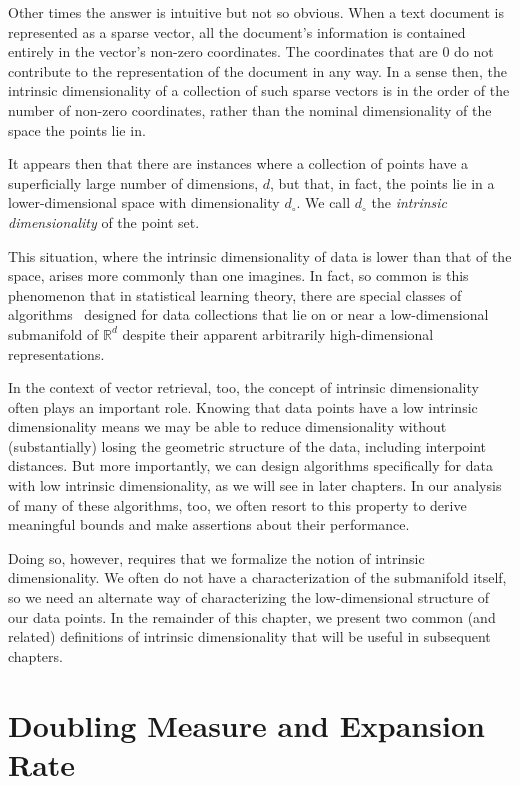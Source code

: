 Other times the answer is intuitive but not so obvious.
When a text document is represented as a sparse vector,
all the document's information is contained entirely in the vector's
non-zero coordinates. The coordinates that are $0$ do not contribute
to the representation of the document in any way.
In a sense then, the intrinsic dimensionality of a collection
of such sparse vectors is in the order of the number of non-zero
coordinates, rather than the nominal dimensionality of the space
the points lie in.

\begin{svgraybox}
It appears then that there are instances where a collection of points
have a superficially large number of dimensions, $d$, but that, in fact,
the points lie in a lower-dimensional space with dimensionality $d_\circ$.
We call $d_\circ$ the \emph{intrinsic dimensionality} of the point set.
\end{svgraybox}

This situation, where the intrinsic dimensionality of data is lower than
that of the space, arises more commonly than one imagines.
In fact, so common is this phenomenon that in statistical learning theory,
there are special classes of algorithms~\citep{ma2012manifold}
designed for data collections that lie on
or near a low-dimensional submanifold of $\mathbb{R}^d$
despite their apparent arbitrarily high-dimensional representations.

In the context of vector retrieval, too, the concept of
intrinsic dimensionality often plays an important role.
Knowing that data points have a low intrinsic dimensionality means
we may be able to reduce dimensionality without (substantially) losing
the geometric structure of the data, including interpoint distances.
But more importantly, we can design algorithms specifically for
data with low intrinsic dimensionality, as we will see in later chapters.
In our analysis of many of these algorithms, too, we often resort
to this property to derive meaningful bounds and make assertions about
their performance.

Doing so, however, requires that we formalize the notion of intrinsic dimensionality.
We often do not have a characterization of the submanifold itself,
so we need an alternate way of characterizing the low-dimensional
structure of our data points. In the remainder of this chapter,
we present two common (and related) definitions of intrinsic dimensionality
that will be useful in subsequent chapters.

\section{Doubling Measure and Expansion Rate}
\label{section:intrinsic-dimensionality:doubling-measure}

